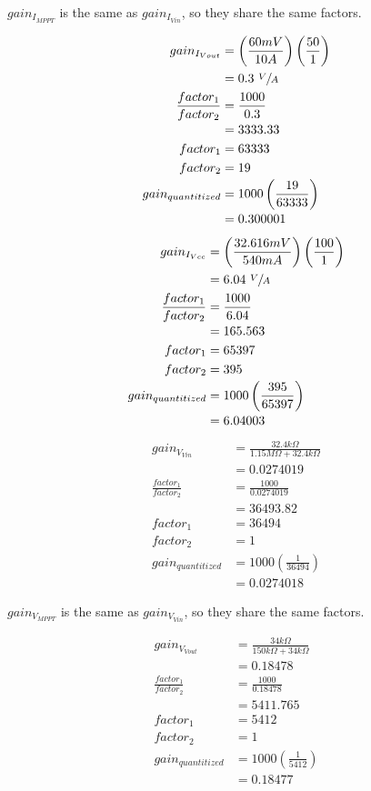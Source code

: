 \documentclass[11pt]{article} %
\begin{document}
\(gain_{I_{MPPT}}\) is the same as \(gain_{I_{Vin}}\), so they share the same factors.


\begin{align*}
gain_{I_{Vout}} &= \left(\frac{60mV}{10A}\right) \left(\frac{50}{1}\right) \\
&= 0.3~\sfrac{V}{A} \\
\frac{factor_1}{factor_2} &= \frac{1000}{0.3} \\
&= 3333.33
\\
factor_1 &= 63333 \\
factor_2 &= 19 \\
gain_{quantitized} &= 1000 \left(\frac{19}{63333}\right) \\
&= 0.300001
\end{align*}

\begin{align*}
gain_{I_{Vcc}} &= \left(\frac{32.616mV}{540mA}\right) \left(\frac{100}{1}\right) \\
&= 6.04~\sfrac{V}{A} \\
\frac{factor_1}{factor_2} &= \frac{1000}{6.04} \\
&= 165.563
\\
factor_1 &= 65397 \\
factor_2 &= 395 \\
gain_{quantitized} &= 1000 \left(\frac{395}{65397}\right) \\
&= 6.04003
\end{align*}

\begin{align*}
gain_{V_{Vin}} &= \frac{32.4k\Omega}{1.15M\Omega + 32.4k\Omega} \\
&= 0.0274019 \\
\frac{factor_1}{factor_2} &= \frac{1000}{0.0274019} \\
&= 36493.82
\\
factor_1 &= 36494 \\
factor_2 &= 1 \\
gain_{quantitized} &= 1000 \left(\frac{1}{36494}\right) \\
&= 0.0274018
\end{align*}

\(gain_{V_{MPPT}}\) is the same as \(gain_{V_{Vin}}\), so they share the same factors.

\begin{align*}
gain_{V_{Vout}} &= \frac{34k\Omega}{150k\Omega + 34k\Omega} \\
&= 0.18478 \\
\frac{factor_1}{factor_2} &= \frac{1000}{0.18478} \\
&= 5411.765
\\
factor_1 &= 5412 \\
factor_2 &= 1 \\
gain_{quantitized} &= 1000 \left(\frac{1}{5412}\right) \\
&= 0.18477
\end{align*}
\end{document}
